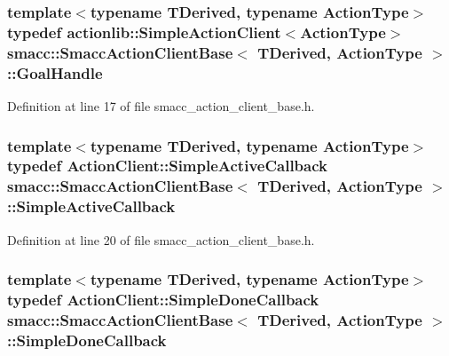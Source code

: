 \subsubsection[{\texorpdfstring{Goal\+Handle}{GoalHandle}}]{\setlength{\rightskip}{0pt plus 5cm}template$<$typename T\+Derived, typename Action\+Type$>$ typedef actionlib\+::\+Simple\+Action\+Client$<$Action\+Type$>$ {\bf smacc\+::\+Smacc\+Action\+Client\+Base}$<$ T\+Derived, Action\+Type $>$\+::{\bf Goal\+Handle}}\hypertarget{classsmacc_1_1SmaccActionClientBase_ab63abc710289c0d22114ad3aec45c916}{}\label{classsmacc_1_1SmaccActionClientBase_ab63abc710289c0d22114ad3aec45c916}


Definition at line 17 of file smacc\+\_\+action\+\_\+client\+\_\+base.\+h.

\subsubsection[{\texorpdfstring{Simple\+Active\+Callback}{SimpleActiveCallback}}]{\setlength{\rightskip}{0pt plus 5cm}template$<$typename T\+Derived, typename Action\+Type$>$ typedef Action\+Client\+::\+Simple\+Active\+Callback {\bf smacc\+::\+Smacc\+Action\+Client\+Base}$<$ T\+Derived, Action\+Type $>$\+::{\bf Simple\+Active\+Callback}}\hypertarget{classsmacc_1_1SmaccActionClientBase_ae5aaa9660a758a113f72359a5cf3884e}{}\label{classsmacc_1_1SmaccActionClientBase_ae5aaa9660a758a113f72359a5cf3884e}


Definition at line 20 of file smacc\+\_\+action\+\_\+client\+\_\+base.\+h.

\subsubsection[{\texorpdfstring{Simple\+Done\+Callback}{SimpleDoneCallback}}]{\setlength{\rightskip}{0pt plus 5cm}template$<$typename T\+Derived, typename Action\+Type$>$ typedef Action\+Client\+::\+Simple\+Done\+Callback {\bf smacc\+::\+Smacc\+Action\+Client\+Base}$<$ T\+Derived, Action\+Type $>$\+::{\bf Simple\+Done\+Callback}}\hypertarget{classsmacc_1_1SmaccActionClientBase_a2cad0a2256df0161c60af458161edbfb}{}\label{classsmacc_1_1SmaccActionClientBase_a2cad0a2256df0161c60af458161edbfb}


